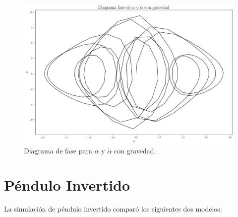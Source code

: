 \documentclass[12pt,letterpaper]{article}
\begin{document}
\begin{figure}[h]
 \centering
 \includegraphics[scale=0.2]{img/dp_phase_alpha_dalpha_G.png}
 \caption{Diagrama de fase para $\alpha$ y $\dot{\alpha}$ con gravedad.}
 \label{fig: dp phase alpha dalpha G}
\end{figure}



\pagebreak

\section*{Péndulo Invertido}

La simulación de péndulo invertido comparó los siguientes dos modelos:
\end{document}
